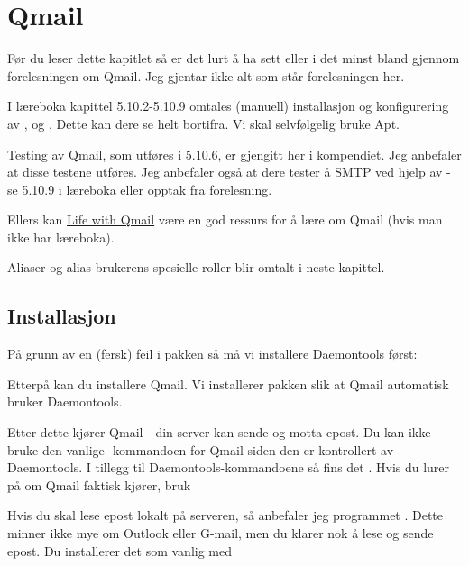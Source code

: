 \chapter{Qmail} %

Før du leser dette kapitlet så er det lurt å ha sett eller i det minst bland gjennom
forelesningen om Qmail. Jeg gjentar ikke alt som står forelesningen her.

I læreboka kapittel 5.10.2-5.10.9 omtales (manuell) installasjon og konfigurering av 
,  og . Dette kan dere se helt bortifra.
Vi skal selvfølgelig bruke Apt.

Testing av Qmail, som utføres i 5.10.6, er gjengitt her i kompendiet. Jeg anbefaler
at disse testene utføres. Jeg anbefaler også at dere tester å 
SMTP ved hjelp av  - se 5.10.9 i læreboka eller opptak fra forelesning.

Ellers kan \href{http://www.lifewithqmail.org/lwq.html}{Life with Qmail} være en god ressurs
for å lære om Qmail (hvis man ikke har læreboka).

\begin{remark}
Aliaser og alias-brukerens spesielle roller blir omtalt i neste kapittel.
\end{remark}


\section{Installasjon}

På grunn av en (fersk) feil i pakken  så må vi installere Daemontools 
først:


Etterpå kan du installere Qmail. Vi installerer pakken  slik at 
Qmail automatisk bruker Daemontools.


Etter dette kjører Qmail - din server kan sende og motta epost. Du kan ikke bruke 
den vanlige -kommandoen for Qmail siden den er kontrollert av 
Daemontools. I tillegg til Daemontools-kommandoene så fins det .
Hvis du lurer på om Qmail faktisk kjører, bruk


Hvis du skal lese epost lokalt på serveren, så anbefaler jeg programmet . 
Dette minner ikke mye om Outlook eller G-mail, men du klarer nok å lese og sende epost.
Du installerer det som vanlig med

